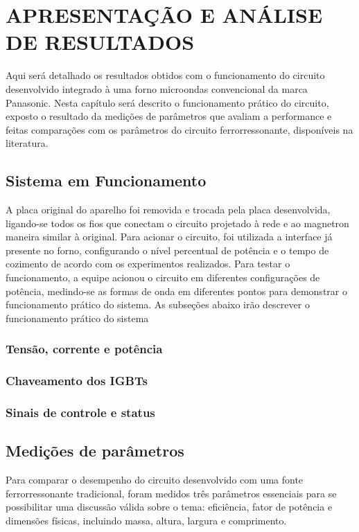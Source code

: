 
\chapter{APRESENTAÇÃO E ANÁLISE DE RESULTADOS}

Aqui será detalhado os resultados obtidos com o funcionamento do circuito desenvolvido integrado à uma forno microondas convencional da marca Panasonic. Nesta capítulo será descrito o funcionamento prático do circuito, exposto o resultado da medições de parâmetros que avaliam a performance e feitas comparações com os parâmetros do circuito ferrorressonante, disponíveis na literatura. 


\section{Sistema em Funcionamento}
A placa original do aparelho foi removida e trocada pela placa desenvolvida, ligando-se todos os fios que conectam o circuito projetado à rede e ao magnetron maneira similar à original. Para acionar o circuito, foi utilizada a interface já presente no forno, configurando o nível percentual de potência e o tempo de cozimento de acordo com os experimentos realizados. Para testar o funcionamento, a equipe acionou o circuito em diferentes configurações de potência, medindo-se as formas de onda em diferentes pontos para demonstrar o funcionamento prático do sistema. As subseções abaixo irão descrever o funcionamento prático do sistema

\subsection{Tensão, corrente e potência}

\subsection{Chaveamento dos IGBTs}

\subsection{Sinais de controle e status}


\section{Medições de parâmetros}
Para comparar o desempenho do circuito desenvolvido com uma fonte ferrorressonante tradicional, foram medidos três parâmetros essenciais para se possibilitar uma discussão válida sobre o tema: eficiência, fator de potência e dimensões físicas, incluindo massa, altura, largura e comprimento. 

